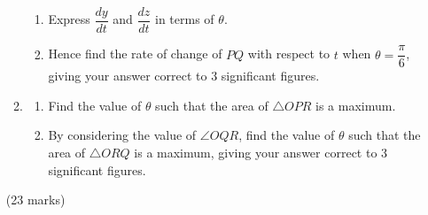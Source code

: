 \documentclass[12pt]{article}
\begin{document}
\begin{enumerate}
\begin{enumerate}
\begin{enumerate}
                \item Express $\dfrac{dy}{dt}$ and $\dfrac{dz}{dt}$ in terms of $\theta$.
                \item Hence find the rate of change of $PQ$ with respect to $t$ when $\theta=\dfrac{\pi}{6}$, giving your answer correct to 3 significant figures.
            \end{enumerate}
            \item \begin{enumerate}
                \item Find the value of $\theta$ such that the area of $\triangle OPR$ is a maximum.
                \item By considering the value of $\angle OQR$, find the value of $\theta$ such that the area of $\triangle ORQ$ is a maximum, giving your answer correct to 3 significant figures. 
            \end{enumerate} 
        \end{enumerate}\hfill(23 marks)

        \hrulefill
            
            \hrulefill
            
            \hrulefill
            
            \hrulefill
            
            \hrulefill
            
            \hrulefill
            
            \hrulefill
            
            \hrulefill
            
            \hrulefill
            
            \hrulefill
            
            \hrulefill
            
            \hrulefill
            
            \hrulefill

            \hrulefill
            
            \hrulefill
            
            \hrulefill
            
            \hrulefill
            
            \hrulefill
            
            \hrulefill
            
            \hrulefill
            
            \hrulefill
            

\end{enumerate}
\end{document}
